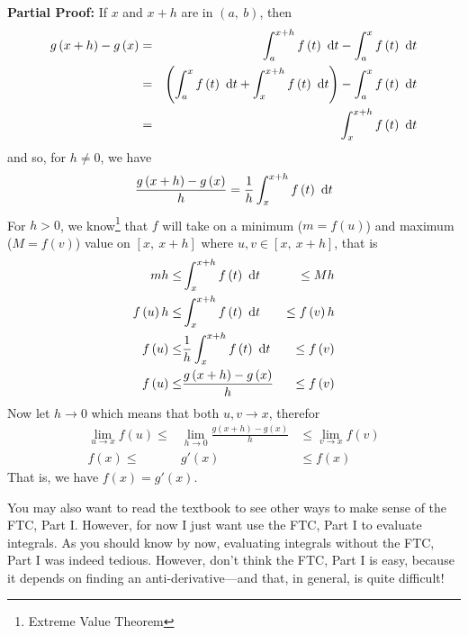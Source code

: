 \documentclass[12pt,addpoints, answers, fleqn]{exam}
\begin{document}
\textbf{Partial Proof:} If $x$ and $x+h$ are in $\left( a, \ b \right)$, then
\begin{eqnarray*}
g \left(x + h \right) - g \left( x \right) &=& \int_a^{x+h} f \left( t \right) \ {\rm{d}}t - \int_a^x f \left( t \right) \ {\rm{d}}t\\
&=& \left( \int_a^{x} f \left( t \right) \ {\rm{d}}t  + \int_{x}^{x+h} f \left( t \right) \ {\rm{d}}t\right) - \int_a^x f \left( t \right) \ {\rm{d}}t\\
&=& \int_{x}^{x+h} f \left( t \right) \ {\rm{d}}t
\end{eqnarray*}
and so, for $h \neq 0$, we have
\[
\frac{g \left(x + h \right) - g \left( x \right)}{h} = \frac{1}{h} \int_{x}^{x+h} f \left( t \right) \ {\rm{d}}t
\]
For $h > 0$, we know\footnote{Extreme Value Theorem} that $f$ will take on a minimum ($m = f\left(u\right)$) and maximum ($M = f\left(v\right)$) value on $\left[ x, \ x + h \right]$ where $u,v \in \left[ x, \ x + h \right]$, that is
\begin{eqnarray*}
m h \leq &\int_{x}^{x+h} f \left( t \right) \ {\rm{d}}t& \leq M h\\
f \left( u \right) h \leq &\int_{x}^{x+h} f \left( t \right) \ {\rm{d}}t& \leq f \left( v \right) h\\
f \left( u \right) \leq &\frac{1}{h} \int_{x}^{x+h} f \left( t \right) \ {\rm{d}}t& \leq f \left( v \right)\\
f \left( u \right) \leq & \displaystyle \frac{g \left(x + h \right) - g \left( x \right)}{h}& \leq f \left( v \right)\\
\end{eqnarray*}
Now let $h \to 0$ which means that both $u, v \to x$, therefor
\begin{eqnarray*}
\mathop {\lim }\limits_{u \to x } f \left( u \right) \leq &\mathop {\lim }\limits_{h \to 0 } \displaystyle \frac{g \left(x + h \right) - g \left( x \right)}{h}& \leq \mathop {\lim }\limits_{v \to x } f \left( v \right)\\
f \left( x \right) \leq & g' \left( x \right)& \leq f \left( x \right)
\end{eqnarray*}
That is, we have $f \left( x \right) =  g' \left( x \right)$.

You may also want to read the textbook to see other ways to make sense of the FTC, Part I. However, for now I just want use the FTC, Part I to evaluate integrals. As you should know by now, evaluating integrals without the FTC, Part I was indeed tedious. However, don't think the FTC, Part I is easy, because it depends on finding an anti-derivative---and that, in general, is quite difficult!
\end{document}
